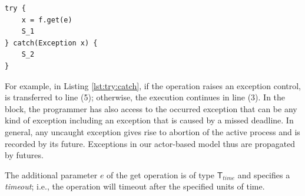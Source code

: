 \vspace{-20pt}
\begin{lstlisting}[float=h, label=lst:try:catch, caption=Using try-catch for processing future values]
try {
	x = f.get(e)
	S_1
} catch(Exception x) {
	S_2
}
\end{lstlisting}
\vspace{-20pt}
For example, in Listing \ref{lst:try:catch}, if the \gett \space operation raises an exception  control,  is transferred to line (5);
otherwise, the execution continues in line (3). 
In the  block, the programmer has also access to the occurred exception that can be 
any kind of exception including an exception that is caused by a missed deadline.
In general, any uncaught exception gives rise to abortion of the active process and is recorded by its future.
Exceptions in our actor-based model thus are propagated by futures.

The additional parameter $e$ of the get operation is of type  $\mathsf{T}_{time}$ and specifies a \emph{timeout};
i.e., the \gett \space operation will timeout after the specified units of time.





